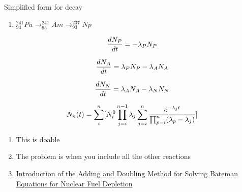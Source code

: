 \documentclass[aspectratio=1610,pdftex,dvipsnames,compress,xcolor={dvipsnames}]{beamer}
\begin{document}
\begin{frame}{Simplified form for decay}
    \begin{enumerate}[series=outerlist,topsep=0pt,itemsep=21pt,leftmargin=*,label=(\arabic*)]
        \item[]$^{241}_{94}Pu \rightarrow ^{241}_{95}Am \rightarrow ^{237}_{93}Np$
    \end{enumerate}

    \vspace*{\fill}

    \begin{equation}
        \large
        \frac{dN_P}{dt} = -\lambda_P N_P
    \end{equation}

    \begin{equation}
        \large
        \frac{dN_A}{dt} = \lambda_P N_P - \lambda_A N_A
    \end{equation}

    \begin{equation}
        \large
        \frac{dN_N}{dt} = \lambda_A N_A - \lambda_N N_N
    \end{equation}

    \begin{equation}
        \large
        N_n(t) = \sum^n_i[N_i^0\prod_{j=i}^{n-1}\lambda_j \sum_{j=i}^n\frac{e^{-\lambda_j t}}{\prod_{p=i}^n (\lambda_p-\lambda_j)}]
    \end{equation}

    \vspace*{\fill}

    \begin{enumerate}[series=outerlist,topsep=0pt,itemsep=7pt,leftmargin=*,label=(\arabic*)]
        \item[]This is doable
        \item[]The problem is when you include all the other reactions
        \item[]\href{https://www.tandfonline.com/doi/full/10.1080/00295639.2022.2129950}{Introduction of the Adding and Doubling Method for Solving Bateman Equations for Nuclear Fuel Depletion}
    \end{enumerate}
\end{frame}
\end{document}
